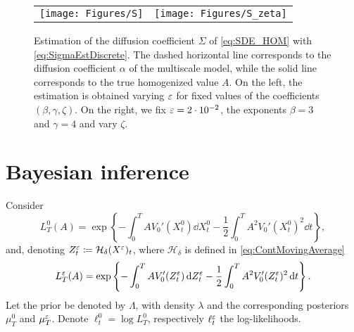 \documentclass[10pt]{article}
\begin{document}
\begin{figure}
	\centering
	\begin{tabular}{cc}
		\texttt{[image: Figures/S]} & \texttt{[image: Figures/S\_zeta]}
	\end{tabular}
	\caption{Estimation of the diffusion coefficient $\Sigma$ of \eqref{eq:SDE_HOM} with \eqref{eq:SigmaEstDiscrete}. The dashed horizontal line corresponds to the diffusion coefficient $\alpha$ of the multiscale model, while the solid line corresponds to the true homogenized value $A$. On the left, the estimation is obtained varying $\varepsilon$ for fixed values of the coefficients $(\beta, \gamma, \zeta)$. On the right, we fix $\varepsilon = 2\cdot 10^{-2}$, the exponents $\beta = 3$ and $\gamma = 4$ and vary $\zeta$.}
	\label{fig:S}
\end{figure}

\section{Bayesian inference}

Consider 
\begin{equation}
L_T^0(A) = \exp\left\{-\int_0^T A V_0'(X_t^0) \dd X_t^0 - \frac12 \int_0^T A^2 V_0'(X_t^0)^2 \dd t \right\},
\end{equation}
and, denoting $Z^\varepsilon_t \coloneqq \mathcal H_\delta(X^\varepsilon)_t$, where $\mathcal H_\delta$ is defined in \eqref{eq:ContMovingAverage}
\begin{equation}
L_T^\varepsilon(A) = \exp\left\{-\int_0^T A V_0'(Z^\varepsilon_t)\,\mathrm{d} Z^\varepsilon_t - \frac12 \int_0^T A^2 V_0'(Z^\varepsilon_t)^2 \,\mathrm{d} t \right\}.
\end{equation}
Let the prior be denoted by $\Lambda$, with density $\lambda$ and the corresponding posteriors $\mu_T^0$ and $\mu_T^\varepsilon$. Denote $\ell_t^0 = \log L_T^0$, respectively $\ell_t^\varepsilon$ the log-likelihoods.
\end{document}
